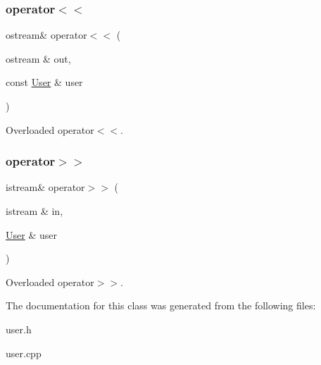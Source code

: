 \subsubsection{\texorpdfstring{operator$<$$<$}{operator<<}}
{\footnotesize\ttfamily ostream\& operator$<$$<$ (\begin{DoxyParamCaption}\item[{ostream \&}]{out,  }\item[{const \hyperlink{class_user}{User} \&}]{user }\end{DoxyParamCaption})\hspace{0.3cm}{\ttfamily [friend]}}

Overloaded operator$<$$<$. \mbox{\label{class_user_aae624f64cdd1af3b59c2443cffa82494}} 
\subsubsection{\texorpdfstring{operator$>$$>$}{operator>>}}
{\footnotesize\ttfamily istream\& operator$>$$>$ (\begin{DoxyParamCaption}\item[{istream \&}]{in,  }\item[{\hyperlink{class_user}{User} \&}]{user }\end{DoxyParamCaption})\hspace{0.3cm}{\ttfamily [friend]}}

Overloaded operator$>$$>$. 

The documentation for this class was generated from the following files\+:\begin{DoxyCompactItemize}
\item 
user.\+h\item 
user.\+cpp\end{DoxyCompactItemize}
